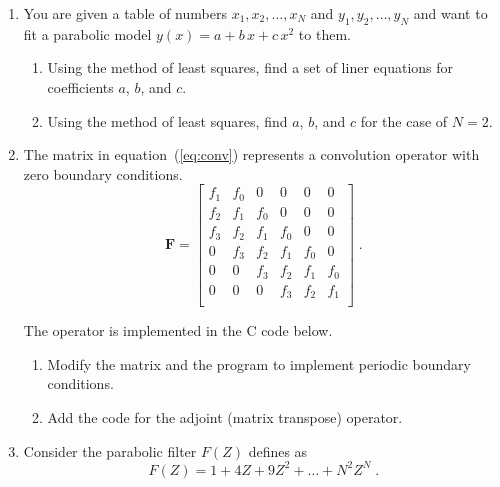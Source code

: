 \begin{enumerate}

\item You are given a table of numbers $x_1, x_2, \ldots, x_N$ and $y_1, y_2, \ldots, y_N$ and 
want to fit a parabolic model $y(x) = a + b\,x + c\,x^2$ to them.

\begin{enumerate}
\item Using the method of least squares, find a set of liner equations for coefficients $a$, $b$, and $c$.
\item Using the method of least squares, find $a$, $b$, and $c$ for the case of $N=2$.
\end{enumerate}

\item The matrix in equation~(\ref{eq:conv}) represents a convolution operator with zero boundary conditions.
\begin{equation}
\label{eq:conv}
\mathbf{F} = \left[\begin{array}{llllll}
f_1 & f_0 & 0   & 0   & 0   & 0   \\
f_2 & f_1 & f_0 & 0   & 0   & 0   \\
f_3 & f_2 & f_1 & f_0 & 0   & 0   \\
0   & f_3 & f_2 & f_1 & f_0 & 0   \\
0   & 0   & f_3 & f_2 & f_1 & f_0 \\
0   & 0   & 0   & f_3 & f_2 & f_1 \\
\end{array}\right]\;.
\end{equation}

The operator is implemented in the C code below.

\lstset{language=c,numbers=left,numberstyle=\tiny,showstringspaces=false}


\begin{enumerate}
\item Modify the matrix and the program to implement periodic boundary conditions.
\item Add the code for the adjoint (matrix transpose) operator.
\end{enumerate}

\item Consider the parabolic filter $F(Z)$ defines as
\begin{equation}
\label{eq:parab}
F(Z) = 1 + 4 Z + 9 Z^2 + \ldots + N^2 Z^N\;.
\end{equation} 


\end{enumerate}
